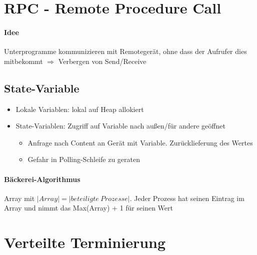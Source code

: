 \documentclass{scrartcl}
\begin{document}
%
%

\section{RPC - Remote Procedure Call}
\paragraph{Idee} Unterprogramme kommunizieren mit Remotegerät, ohne dass der Aufrufer dies mitbekommt $\Rightarrow$ Verbergen von Send/Receive



\subsection{State-Variable}
\begin{itemize}
\item Lokale Variablen: lokal auf Heap allokiert
\item State-Variablen: Zugriff auf Variable nach außen/für andere geöffnet
\begin{itemize}
\item Anfrage nach Content an Gerät mit Variable. Zurücklieferung des Wertes
\item Gefahr in Polling-Schleife zu geraten
\end{itemize}
\end{itemize}

\paragraph{Bäckerei-Algorithmus} Array mit $|Array| = |beteiligte\ Prozesse|$. Jeder Prozess hat seinen Eintrag im Array und nimmt das Max(Array) + 1 für seinen Wert




%
%

\section{Verteilte Terminierung}
\end{document}
